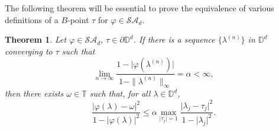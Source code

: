 \documentclass[11pt, reqno]{amsart}
\newtheorem{theorem}{Theorem}[section]
\newcommand\1{\boldsymbol {1}}
\numberwithin{equation}{section}
\begin{document}
The following theorem 
will be essential to prove the equivalence of various definitions of a $B$-point $\tau$ for $\varphi\in\mathcal{SA}_{d}$.
\begin{theorem}\label{theorem4.9generalized}
Let $\varphi\in\mathcal{SA}_{d}$, $\tau\in\partial\mathbb{D}^{d}$. If there is a sequence $\{\lambda^{(n)}\}$ in $\mathbb{D}^{d}$ converging to $\tau$ such that
$$\lim_{n\rightarrow \infty}\dfrac{1-\lvert \varphi(\lambda^{(n)})\rvert}{1-\|\lambda^{(n)}\|_{\infty}}=\alpha<\infty,$$
then there exists $\omega\in\mathbb{T}$ such that, for all $\lambda\in\mathbb{D}^{d}$, 
\begin{equation}\label{alphamaxequtionforgeneralized}
\dfrac{\lvert \varphi(\lambda)-\omega\rvert^{2}}{1-\lvert \varphi(\lambda) \rvert^{2}} \leq \alpha \max_{\lvert \tau_{j} \rvert=1} \dfrac{\lvert \lambda_{j}-\tau_{j}\rvert^{2}}{1-\lvert \lambda_{j} \rvert^{2}}.
\end{equation}
\end{theorem}
\end{document}
